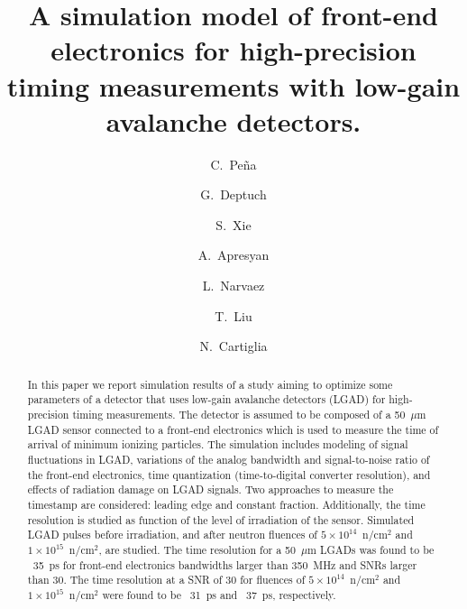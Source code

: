 \documentclass[preprint,1p]{elsarticle}
\begin{document}
\linenumbers

\begin{frontmatter}



\title{A simulation model of front-end electronics for high-precision timing measurements with low-gain avalanche detectors.}


\author[1,2]{C.~Pe\~na}
\author[1]{G.~Deptuch}
\author[2]{S.~Xie}
\author[1]{A.~Apresyan}
\author[2]{L.~Narvaez}
\author[1]{T.~Liu}
\author[3]{N.~Cartiglia}


\address[1]{Fermi National Accelerator Laboratory, Batavia, IL, USA}
\address[2]{California Institute of Technology, Pasadena, CA, USA}
\address[3]{INFN, Torino, Italy}

\begin{abstract}
In this paper we report simulation results of a study aiming to optimize some
parameters of a detector that uses low-gain avalanche detectors (LGAD) for
high-precision timing measurements. The detector is assumed to be composed of a
50~$\mu$m LGAD sensor connected to a front-end electronics which is used to
measure the time of arrival of minimum ionizing particles. The simulation
includes modeling of signal fluctuations in LGAD, variations of the analog
bandwidth and signal-to-noise ratio of the front-end electronics, time
quantization (time-to-digital converter resolution), and effects of radiation damage on LGAD signals. Two approaches to
measure the timestamp are considered: leading edge and constant fraction.
Additionally, the time resolution is studied as function of the level of
irradiation of the sensor. Simulated LGAD pulses before irradiation, and after
neutron fluences of $5\times 10^{14}$~n/cm$^2$ and $1\times 10^{15}$~n/cm$^2$,
are studied. The time resolution for a 50~$\mu$m LGADs was found to be ~35~\si{ps}
for front-end electronics bandwidths larger than 350~\si{MHz} and SNRs larger
than 30. The time resolution at a SNR of 30 for fluences of $5\times
10^{14}$~n/cm$^2$ and $1\times 10^{15}$~n/cm$^2$ were found to be ~31~\si{ps}
and ~37~\si{ps}, respectively.
\end{abstract}


\end{frontmatter}
\end{document}
